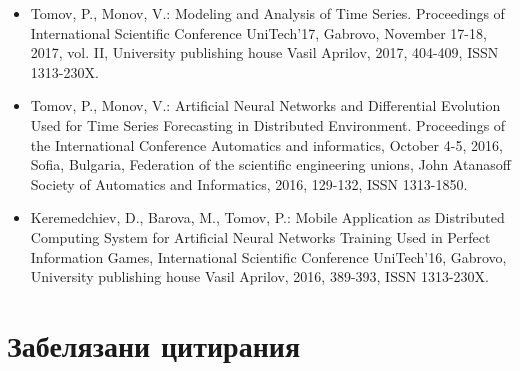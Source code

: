 \begin{itemize}
\item Tomov, P., Monov, V.: Modeling and Analysis of Time Series. Proceedings of International Scientific Conference UniTech’17, Gabrovo, November 17-18, 2017, vol. II, University publishing house Vasil Aprilov, 2017, 404-409, ISSN 1313-230X.

\item Tomov, P., Monov, V.: Artificial Neural Networks and Differential Evolution Used for Time Series Forecasting in Distributed Environment. Proceedings of the International Conference Automatics and informatics, October 4-5, 2016, Sofia, Bulgaria, Federation of the scientific engineering unions, John Atanasoff Society of Automatics and Informatics, 2016, 129-132, ISSN 1313-1850.

\item Keremedchiev, D., Barova, M., Tomov, P.: Mobile Application as Distributed Computing System for Artificial Neural Networks Training Used in Perfect Information Games, International Scientific Conference UniTech’16, Gabrovo, University publishing house Vasil Aprilov, 2016, 389-393, ISSN 1313-230X.
\end{itemize}\newpage

\section*{Забелязани цитирания}

